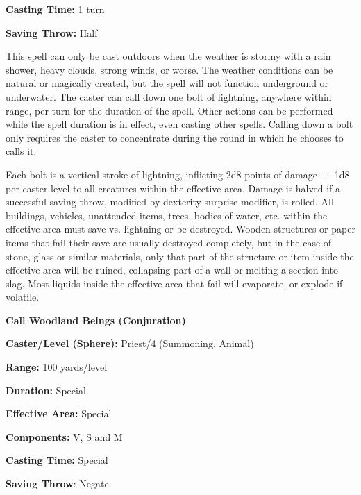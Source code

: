\begin{multicols}{2}
\begin{minipage}{\columnwidth}
\noindent \textbf{Casting Time:} 1 turn

\noindent \textbf{Saving Throw:} Half

\end{minipage}

This spell can only be cast outdoors when the weather is stormy with a rain shower, heavy clouds, strong winds, or worse.  The weather conditions can be natural or magically created, but the spell will not function underground or underwater.  The caster can call down one bolt of lightning, anywhere within range, per turn for the duration of the spell.  Other actions can be performed while the spell duration is in effect, even casting other spells. Calling down a bolt only requires the caster to concentrate during the round in which he chooses to calls it.  

Each bolt is a vertical stroke of lightning, inflicting 2d8 points of damage~+~1d8 per caster level to all creatures within the effective area.  Damage is halved if a successful saving throw, modified by dexterity-surprise modifier, is rolled.  All buildings, vehicles, unattended items, trees, bodies of water, etc. within the effective area must save vs. lightning or be destroyed.  Wooden structures or paper items that fail their save are usually destroyed completely, but in the case of stone, glass or similar materials, only that part of the structure or item inside the effective area will be ruined, collapsing part of a wall or melting a section into slag.  Most liquids inside the effective area that fail will evaporate, or explode if volatile.

\vspace{1em}

\noindent
\begin{minipage}{\columnwidth}

\noindent \textbf{Call Woodland Beings (Conjuration)}

\noindent \textbf{Caster/Level (Sphere):} Priest/4 (Summoning, Animal)

\noindent \textbf{Range:} 100 yards/level

\noindent \textbf{Duration:} Special

\noindent \textbf{Effective Area:} Special

\noindent \textbf{Components:} V, S and M

\noindent \textbf{Casting Time:} Special

\noindent \textbf{Saving Throw}: Negate

\end{minipage}


\end{multicols}
